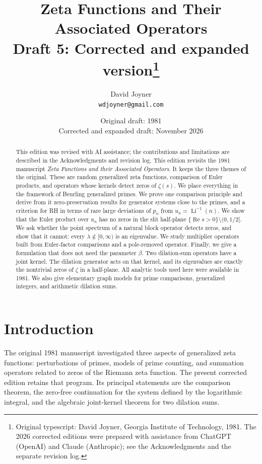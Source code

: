 \documentclass[12pt,letterpaper]{article}
\title{Zeta Functions and Their Associated Operators\\[0.3em]
\large Draft 5: Corrected and expanded version\thanks{Original typescript: David Joyner, Georgia Institute of Technology, 1981. The 2026 corrected editions were prepared with assistance from ChatGPT (OpenAI) and Claude (Anthropic); see the Acknowledgments and the separate revision log.}}
\author{David Joyner\\[0.2em]\normalsize\texttt{wdjoyner@gmail.com}}
\date{Original draft: 1981\\Corrected and expanded draft: November 2026}
\theoremstyle{definition}
\theoremstyle{remark}
\numberwithin{equation}{section}
\newcommand{\Li}{\operatorname{Li}}
\newcommand{\Ree}{\operatorname{Re}}
\begin{document}
\maketitle

\begin{abstract}
This edition was revised with AI assistance; the contributions and limitations are described in the Acknowledgments and revision log.
This edition revisits the 1981 manuscript \emph{Zeta Functions and their
Associated Operators}. It keeps the three themes of the original. These are
random generalized zeta functions, comparison of Euler products, and
operators whose kernels detect zeros of $\zeta(s)$. We place everything in
the framework of Beurling generalized primes. We prove one comparison
principle and derive from it zero-preservation results for generator
systems close to the primes, and a criterion for RH in terms of rare large
deviations of $p_n$ from $u_n=\Li^{-1}(n)$. We show that
the Euler product over $u_n$ has no zeros in the slit half-plane
$\{\Ree s>0\}\setminus(0,1/2]$. We ask whether the point spectrum of a
natural block operator detects zeros, and show that it cannot: every
$\lambda\notin[0,\infty)$ is an eigenvalue. We study multiplier operators
built from Euler-factor comparisons and a pole-removed operator. Finally,
we give a formulation that does not need the parameter $\beta$. Two
dilation-sum operators have a joint kernel. The dilation generator acts on
that kernel, and its eigenvalues are exactly the nontrivial zeros of
$\zeta$ in a half-plane. All analytic tools used here were available in 1981. We also give elementary graph models for prime comparisons, generalized integers, and arithmetic dilation sums.
\end{abstract}

\tableofcontents

\section{Introduction}\label{sec:introduction}

The original 1981 manuscript investigated three aspects of generalized
zeta functions: perturbations of primes, models of prime counting, and
summation operators related to zeros of the Riemann zeta function.
The present corrected edition retains that program.  Its principal
statements are the comparison theorem, the zero-free continuation for the
system defined by the logarithmic integral, and the algebraic joint-kernel
theorem for two dilation sums.
\end{document}
